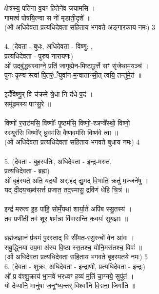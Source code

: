 क्षेत्र॑स्य॒ पति॑ना व॒यꣳ हि॒तेने॑व जयामसि ।\\
गामश्वं॑ पोषयि॒त्न्वा स नो॑ मृडाती॒दृशे᳚ ॥\\
(ओं अधिदेवता प्रत्यधिदेवता सहिताय भगवते अङ्गारकाय नमः) 3\\
\\
4. (देवता - बुधः, अधिदेवता - विष्णु: ,\\
प्रत्यधिदेवता - पुरुष नारायणः)\\
ओं उद्बु॑द्ध्यस्वाग्ने॒ प्रति॑ जागृह्येन-मिष्टापू॒र्त्ते सꣳ सृ॑जेथाम॒यञ्च॑ ।\\
पुनः॑ कृ॒ण्वꣲस्त्वा॑ पि॒तरं॒ँयुवा॑न-म॒न्वाताꣳ॑सी॒त् त्वयि॒ तन्तु॑मे॒तं ॥\\
\\
इ॒दंँविष्णु॒र् वि च॑क्रमे त्रे॒धा नि द॑धे प॒दं ।\\
समू॑ढमस्य पाꣳसु॒रे ॥\\
\\
विष्णो॑ र॒राट॑मसि॒ विष्णोः᳚ पृ॒ष्ठम॑सि॒ विष्णो॒-श्ञप्त्रे᳚स्थो॒ विष्णो॒\\
स्स्यूर॑सि॒ विष्णो᳚र् ध्रु॒वम॑सि वैष्ण॒वम॑सि॒ विष्ण॑वे त्वा ॥\\
(ओं अधिदेवता प्रत्यधिदेवता सहिताय भगवते बुधाय नमः) 4\\
\\
5. (देवता - बुहस्पतिः, अधिदेवता - इन्द्र-मरुत,\\
प्रत्यधिदेवता - ब्रह्म)\\
ओं बृह॑स्पते॒ अति॒ यद॒र्यो अर्.ह᳚द् द्यु॒मद् वि॒भाति॒ क्रतु॑ म॒ज्जने॑षु ।\\
यद् दी॒दय॒च्छव॑सर्त्त प्रजात॒ तद॒स्मासु॒ द्रवि॑णं धेहि चि॒त्रं ॥\\
\\
इन्द्र॑ मरुत्व इ॒ह पा॑हि॒ सोमंँ॒यथा॑ शार्या॒ते अपि॑ब स्सु॒तस्य॑ ।\\
तव॒ प्रणी॑ती॒ तव॑ शूर॒ शर्म॒न्ना वि॑वासन्ति क॒वयः॑ सुय॒ज्ञाः ॥\\
\\
ब्रह्म॑जज्ञा॒नं प्र॑थ॒मं पु॒रस्ता॒द् वि सी॑म॒त-स्सु॒रुचो॑ वे॒न आ॑वः ।\\
सबु॒द्ध्निया॑ उप॒मा अ॑स्य वि॒ष्ठा स्स॒तश्च॒ योनि॒मस॑तश्च॒ विवः॑ ॥\\
(ओं अधिदेवता प्रत्यधिदेवता सहिताय भगवते बृहस्पतये नमः) 5
\\
6. (देवता - शुक्रः, अधिदेवता - इन्द्राणी, प्रत्यधिदेवता - इन्द्रः)\\
ओं प्र व॑श्शु॒क्राय॑ भा॒नवे॑ भरध्वꣳ ह॒व्यं म॒तिं चा॒ग्नये॒ सुपू॑तं ।\\
यो दैव्या॑नि॒ मानु॑षा ज॒नूꣲष्य॒न्तर् विश्वा॑नि वि॒द्मना॒ जिगा॑ति ॥\\
